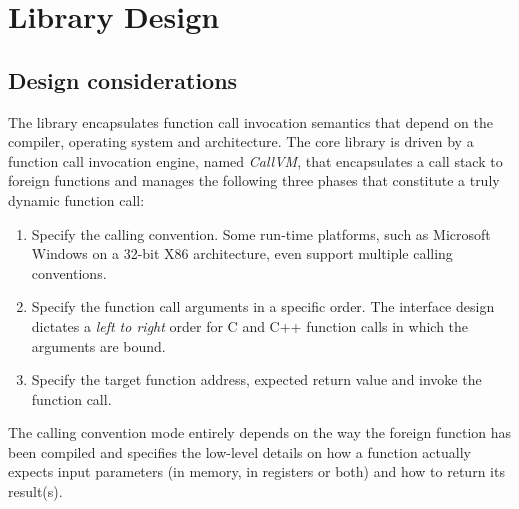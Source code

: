 %
%
%
%

\clearpage
\section{Library Design}


\subsection{Design considerations}

The  library encapsulates function call invocation semantics
that depend on the compiler, operating system and architecture.
The core library is driven by a function call invocation engine, 
named \emph{CallVM}, that encapsulates a call stack to foreign functions 
and manages the following three phases that constitute a truly dynamic function
call:

\begin{enumerate}
\item Specify the calling convention. Some run-time platforms, such as
Microsoft Windows on a 32-bit X86 architecture, even support multiple calling
conventions.
\item Specify the function call arguments in a specific order. The 
interface design dictates a \emph{left to right} order for C and C++ function 
calls in which the arguments are bound.
\item Specify the target function address, expected return value and 
invoke the function call.
\end{enumerate}

The calling convention mode entirely depends on the way the foreign function
has been compiled and specifies the low-level details on how a function
actually expects input parameters (in memory, in registers or both) and how to
return its result(s).



